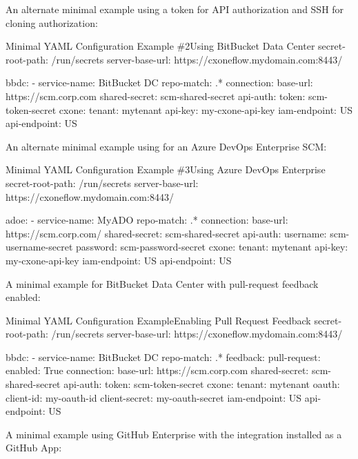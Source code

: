 \pagebreak
An alternate minimal example using a token for API authorization and SSH for cloning authorization:

\begin{code}{Minimal YAML Configuration Example \#2}{Using BitBucket Data Center}{}
secret-root-path: /run/secrets
server-base-url: https://cxoneflow.mydomain.com:8443/

bbdc:
    - service-name: BitBucket DC
      repo-match: .*
      connection:
      base-url: https://scm.corp.com
      shared-secret: scm-shared-secret
      api-auth:
        token: scm-token-secret
      cxone:
        tenant: mytenant
        api-key: my-cxone-api-key
        iam-endpoint: US
        api-endpoint: US
\end{code}
    
\pagebreak
An alternate minimal example using for an Azure DevOps Enterprise SCM:

\begin{code}{Minimal YAML Configuration Example \#3}{Using Azure DevOps Enterprise}{}
secret-root-path: /run/secrets
server-base-url: https://cxoneflow.mydomain.com:8443/

adoe:
    - service-name: MyADO
      repo-match: .*
      connection:
      base-url: https://scm.corp.com/
      shared-secret: scm-shared-secret
      api-auth:
        username: scm-username-secret
        password: scm-password-secret
      cxone:
        tenant: mytenant
        api-key: my-cxone-api-key
        iam-endpoint: US
        api-endpoint: US
\end{code}

\pagebreak
A minimal example for BitBucket Data Center with pull-request feedback enabled:

\begin{code}{Minimal YAML Configuration Example}{Enabling Pull Request Feedback}{}
secret-root-path: /run/secrets
server-base-url: https://cxoneflow.mydomain.com:8443/

bbdc:
    - service-name: BitBucket DC
      repo-match: .*
      feedback:
        pull-request:
          enabled: True
      connection:
        base-url: https://scm.corp.com
        shared-secret: scm-shared-secret
        api-auth:
          token: scm-token-secret
      cxone:
        tenant: mytenant
        oauth:
          client-id: my-oauth-id
          client-secret: my-oauth-secret
        iam-endpoint: US
        api-endpoint: US
\end{code}

\pagebreak
A minimal example using GitHub Enterprise with the \cxoneflow integration installed
as a GitHub App:

  
